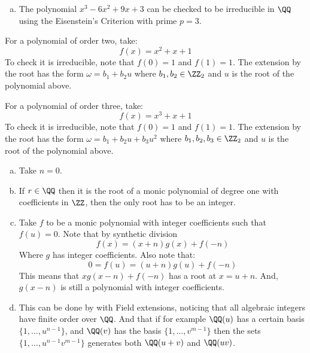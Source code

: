 \begin{enumerate}[(a)]
\item The polynomial $x^3-6x^2+9x+3$ can be checked to be irreducible in $\QQ$ using the Eisenstein's Criterion with prime $p=3$. 
\end{enumerate}

For a polynomial of order two, take:
$$f(x) = x^2+x+1$$
To check it is irreducible, note that $f(0) =1$ and $f(1)=1$. The extension by the root has the form $\omega = b_1 + b_2 u$ where $b_1,b_2\in \ZZ_2$ and $u$ is the root of the polynomial above.

For a polynomial of order three, take:
$$f(x) = x^3+x+1$$
To check it is irreducible, note that $f(0) =1$ and $f(1)=1$. The extension by the root has the form $\omega = b_1 + b_2 u + b_3 u^2$ where $b_1,b_2,b_3\in \ZZ_2$ and $u$ is the root of the polynomial above.

\begin{enumerate}[(a)]
\item Take $n=0$.
\item If $r\in \QQ$ then it is the root of a monic polynomial of degree one with coefficients in $\ZZ$, then the only root has to be an integer.
\item Take $f$ to be a monic polynomial with integer coefficients such that $f(u)=0$. Note that by synthetic division 
$$f(x) = (x+n)g(x) + f(-n)$$
Where $g$ has integer coefficients. Also note that:
$$0=f(u)=(u+n)g(u) +f(-n)$$
This means that $xg(x-n) + f(-n)$ has a root at $x=u+n$. And, $g(x-n)$ is still a polynomial with integer coefficients.
\item  This can be done by with Field extensions, noticing that all algebraic integers have finite order over $\QQ$. And that if for example $\QQ(u)$ has a certain basis $\{1,\ldots,u^{n-1}\}$, and $\QQ(v)$ has the basis $\{1,\ldots,v^{m-1}\}$ then the sets $\{1,\ldots,u^{n-1}v^{m-1}\}$ generates both $\QQ(u+v)$ and $\QQ(uv)$.
\end{enumerate}
